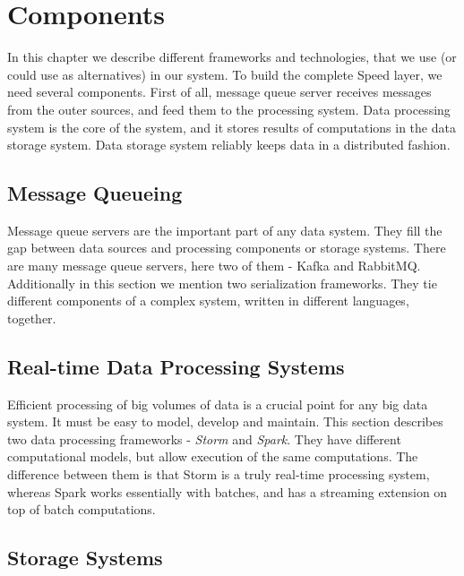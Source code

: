 \chapter{Components}
\label{chap:components}

In this chapter we describe different frameworks and technologies, that we use (or could use as alternatives) in our system.
To build the complete Speed layer, we need several components.
First of all, message queue server receives messages from the outer sources, and feed them to the processing system.
Data processing system is the core of the system, and it stores results of computations in the data storage system.
Data storage system reliably keeps data in a distributed fashion. 

\section{Message Queueing}

Message queue servers are the important part of any data system.
They fill the gap between data sources and processing components or storage systems.
There are many message queue servers, here two of them - Kafka and RabbitMQ.
Additionally in this section we mention two serialization frameworks.
They tie different components of a complex system, written in different languages, together.






\section{Real-time Data Processing Systems}

Efficient processing of big volumes of data is a crucial point for any big data system.
It must be easy to model, develop and maintain.
This section describes two data processing frameworks - \textit{Storm} and \textit{Spark}.
They have different computational models, but allow execution of the same computations.
The difference between them is that Storm is a truly real-time processing system, whereas Spark works essentially with batches, and has a streaming extension on top of batch computations.




\section{Storage Systems}

